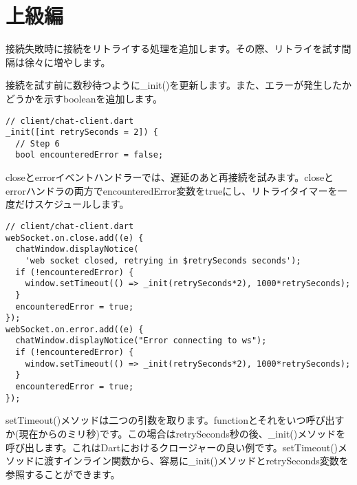 
\section{上級編}

接続失敗時に接続をリトライする処理を追加します。その際、リトライを試す間隔は徐々に増やします。

接続を試す前に数秒待つように\_init()を更新します。また、エラーが発生したかどうかを示すbooleanを追加します。

\begin{verbatim}
// client/chat-client.dart
_init([int retrySeconds = 2]) {
  // Step 6
  bool encounteredError = false;
\end{verbatim}

closeとerrorイベントハンドラーでは、遅延のあと再接続を試みます。closeとerrorハンドラの両方でencounteredError変数をtrueにし、リトライタイマーを一度だけスケジュールします。

\begin{verbatim}
// client/chat-client.dart
webSocket.on.close.add((e) {
  chatWindow.displayNotice(
    'web socket closed, retrying in $retrySeconds seconds');
  if (!encounteredError) {
    window.setTimeout(() => _init(retrySeconds*2), 1000*retrySeconds);
  }
  encounteredError = true;
});
webSocket.on.error.add((e) {
  chatWindow.displayNotice("Error connecting to ws");
  if (!encounteredError) {
    window.setTimeout(() => _init(retrySeconds*2), 1000*retrySeconds);
  }
  encounteredError = true;
});
\end{verbatim}

setTimeout()メソッドは二つの引数を取ります。functionとそれをいつ呼び出すか(現在からのミリ秒)です。この場合はretrySeconds秒の後、\_init()メソッドを呼び出します。これはDartにおけるクロージャーの良い例です。setTimeout()メソッドに渡すインライン関数から、容易に\_init()メソッドとretrySeconds変数を参照することができます。

\clearpage
